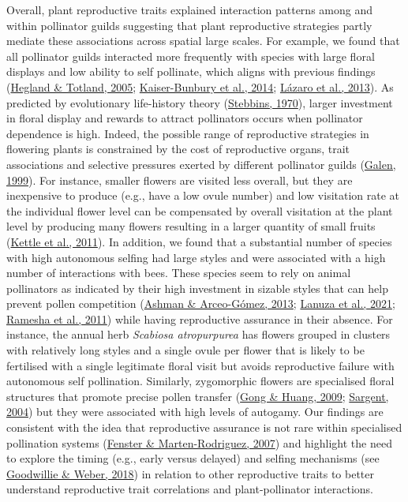 \documentclass[
  12pt,
  a4paper,
]{article}
\begin{document}
Overall, plant reproductive traits explained interaction patterns among and within pollinator guilds suggesting that plant reproductive strategies partly mediate these associations across spatial large scales. For example, we found that all pollinator guilds interacted more frequently with species with large floral displays and low ability to self pollinate, which aligns with previous findings (\protect\hyperlink{ref-hegland2005}{Hegland \& Totland, 2005}; \protect\hyperlink{ref-kaiser2014}{Kaiser-Bunbury et al., 2014}; \protect\hyperlink{ref-lazaro2013}{Lázaro et al., 2013}). As predicted by evolutionary life-history theory (\protect\hyperlink{ref-stebbins1970}{Stebbins, 1970}), larger investment in floral display and rewards to attract pollinators occurs when pollinator dependence is high. Indeed, the possible range of reproductive strategies in flowering plants is constrained by the cost of reproductive organs, trait associations and selective pressures exerted by different pollinator guilds (\protect\hyperlink{ref-galen1999}{Galen, 1999}). For instance, smaller flowers are visited less overall, but they are inexpensive to produce (e.g., have a low ovule number) and low visitation rate at the individual flower level can be compensated by overall visitation at the plant level by producing many flowers resulting in a larger quantity of small fruits (\protect\hyperlink{ref-kettle2011}{Kettle et al., 2011}). In addition, we found that a substantial number of species with high autonomous selfing had large styles and were associated with a high number of interactions with bees. These species seem to rely on animal pollinators as indicated by their high investment in sizable styles that can help prevent pollen competition (\protect\hyperlink{ref-ashman2013}{Ashman \& Arceo-Gómez, 2013}; \protect\hyperlink{ref-lanuza2021}{Lanuza et al., 2021}; \protect\hyperlink{ref-ramesha2011}{Ramesha et al., 2011}) while having reproductive assurance in their absence. For instance, the annual herb \emph{Scabiosa atropurpurea} has flowers grouped in clusters with relatively long styles and a single ovule per flower that is likely to be fertilised with a single legitimate floral visit but avoids reproductive failure with autonomous self pollination. Similarly, zygomorphic flowers are specialised floral structures that promote precise pollen transfer (\protect\hyperlink{ref-gong2009}{Gong \& Huang, 2009}; \protect\hyperlink{ref-sargent2004}{Sargent, 2004}) but they were associated with high levels of autogamy. Our findings are consistent with the idea that reproductive assurance is not rare within specialised pollination systems (\protect\hyperlink{ref-fenster2007}{Fenster \& Marten-Rodriguez, 2007}) and highlight the need to explore the timing (e.g., early versus delayed) and selfing mechanisms (see \protect\hyperlink{ref-goodwillie2018}{Goodwillie \& Weber, 2018}) in relation to other reproductive traits to better understand reproductive trait correlations and plant-pollinator interactions.
\end{document}
